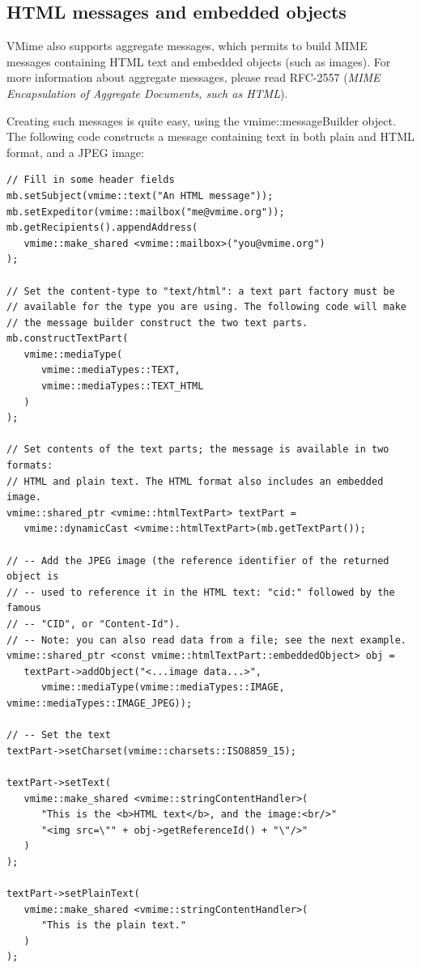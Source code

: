 \subsection{HTML messages and embedded objects} %

VMime also supports aggregate messages, which permits to build MIME messages
containing HTML text and embedded objects (such as images). For more information
about aggregate messages, please read RFC-2557 (\emph{MIME Encapsulation of
Aggregate Documents, such as HTML}).

Creating such messages is quite easy, using the {\vcode vmime::messageBuilder}
object. The following code constructs a message containing text in both plain
and HTML format, and a JPEG image:

\begin{lstlisting}[caption={Building an HTML message with an embedded image
using the {\vcode vmime::messageBuilder}}]
// Fill in some header fields
mb.setSubject(vmime::text("An HTML message"));
mb.setExpeditor(vmime::mailbox("me@vmime.org"));
mb.getRecipients().appendAddress(
   vmime::make_shared <vmime::mailbox>("you@vmime.org")
);

// Set the content-type to "text/html": a text part factory must be
// available for the type you are using. The following code will make
// the message builder construct the two text parts.
mb.constructTextPart(
   vmime::mediaType(
      vmime::mediaTypes::TEXT,
      vmime::mediaTypes::TEXT_HTML
   )
);

// Set contents of the text parts; the message is available in two formats:
// HTML and plain text. The HTML format also includes an embedded image.
vmime::shared_ptr <vmime::htmlTextPart> textPart =
   vmime::dynamicCast <vmime::htmlTextPart>(mb.getTextPart());

// -- Add the JPEG image (the reference identifier of the returned object is
// -- used to reference it in the HTML text: "cid:" followed by the famous
// -- "CID", or "Content-Id").
// -- Note: you can also read data from a file; see the next example.
vmime::shared_ptr <const vmime::htmlTextPart::embeddedObject> obj =
   textPart->addObject("<...image data...>",
      vmime::mediaType(vmime::mediaTypes::IMAGE, vmime::mediaTypes::IMAGE_JPEG));

// -- Set the text
textPart->setCharset(vmime::charsets::ISO8859_15);

textPart->setText(
   vmime::make_shared <vmime::stringContentHandler>(
      "This is the <b>HTML text</b>, and the image:<br/>"
      "<img src=\"" + obj->getReferenceId() + "\"/>"
   )
);

textPart->setPlainText(
   vmime::make_shared <vmime::stringContentHandler>(
      "This is the plain text."
   )
);
\end{lstlisting}

